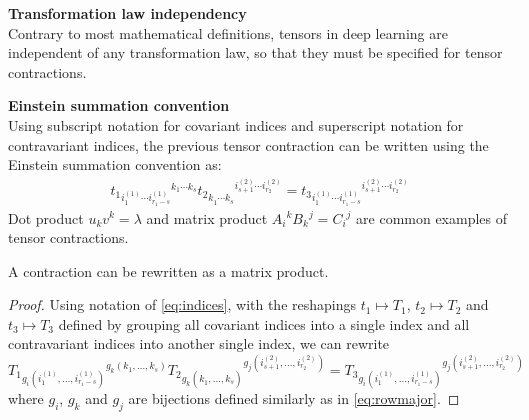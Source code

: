 \begin{remark}\textbf{Transformation law independency}\\
Contrary to most mathematical definitions, tensors in deep learning are independent of any transformation law, so that they must be specified for tensor contractions.
\end{remark}

\begin{remark}\textbf{Einstein summation convention}\\
Using subscript notation for covariant indices and superscript notation for contravariant indices, the previous tensor contraction can be written using the Einstein summation convention as:
\begin{gather}
t_1 \hspace{0pt}_{i_1^{(1)} \cdots i_{r_1-s}^{(1)} } \hspace{0pt}^{ k_1 \cdots k_s} 
t_2 \hspace{0pt}_{ k_1^{\phantom{(}} \cdots k_s^{\phantom{(}}} \hspace{0pt}^{i_{s+1}^{(2)} \cdots i_{r_2}^{(2)}} =
t_3 \hspace{0pt}_ {i_1^{(1)} \cdots i_{r_1-s}^{(1)} } \hspace{0pt}^{i_{s+1}^{(2)} \cdots i_{r_2}^{(2)}}
\label{eq:indices}
\end{gather}
Dot product $u_k v^k = \lambda $ and matrix product $A_i\hspace{0pt}^k B_k\hspace{0pt}^j = C_i\hspace{0pt}^j$ are common examples of tensor contractions.
\end{remark}

\begin{proposition}%
A contraction can be rewritten as a matrix product.
\label{prop:matprodeq}
\end{proposition}
\begin{proof}
Using notation of \eqref{eq:indices}, with the reshapings $t_1 \mapsto T_1$, $t_2 \mapsto T_2$ and $t_3 \mapsto T_3$ defined by grouping all covariant indices into a single index and all contravariant indices into another single index, we can rewrite
$$
T_1 \hspace{0pt}_{g_i(i_1^{(1)}, \ldots, i_{r_1-s}^{(1)})} \hspace{0pt}^{g_k(k_1, \ldots, k_s)} 
T_2 \hspace{0pt}_{g_k(k_1^{\phantom{(}}, \ldots, k_s^{\phantom{(}})} \hspace{0pt}^{g_j(i_{s+1}^{(2)}, \ldots, i_{r_2}^{(2)})} =
T_3 \hspace{0pt}_ {g_i(i_1^{(1)}, \ldots, i_{r_1-s}^{(1)})} \hspace{0pt}^{g_j(i_{s+1}^{(2)}, \ldots, i_{r_2}^{(2)})}
$$
where $g_i$, $g_k$ and $g_j$ are bijections defined similarly as in \eqref{eq:rowmajor}.
\end{proof}

